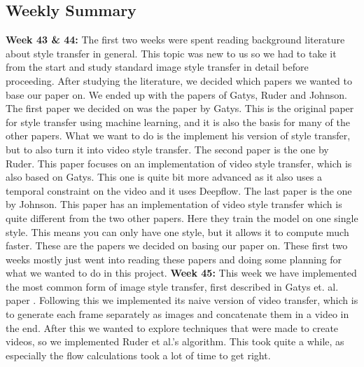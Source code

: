 \documentclass{article}
\begin{document}
\begin{center}
\section*{Weekly Summary}
\end{center}
\textbf{Week 43 \& 44:} \newline
The first two weeks were spent reading background literature about style transfer in general. This topic was new to us so we had to take it from the start and study standard image style transfer in detail before proceeding.\newline\newline
After studying the literature, we decided which papers we wanted to base our paper on. We ended up with the papers of Gatys, Ruder and Johnson. The first paper we decided on was the paper by Gatys. This is the original paper for style transfer using machine learning, and it is also the basis for many of the other papers. What we want to do is the implement his version of style transfer, but to also turn it into video style transfer.\newline\newline
The second paper is the one by Ruder. This paper focuses on an implementation of video style transfer, which is also based on Gatys. This one is quite bit more advanced as it also uses a temporal constraint on the video and it uses Deepflow.\newline\newline
The last paper is the one by Johnson. This paper has an implementation of video style transfer which is quite different from the two other papers. Here they train the model on one single style. This means you can only have one style, but it allows it to compute much faster.\newline\newline
These are the papers we decided on basing our paper on. These first two weeks mostly just went into reading these papers and doing some planning for what we wanted to do in this project.
\newline\newline
\textbf{Week 45:} \newline
This week we have implemented the most common form of image style transfer, first described in Gatys et. al. paper \cite{Gatys:1}. Following this we implemented its naive version of video transfer, which is to generate each frame separately as images and concatenate them in a video in the end. After this we wanted to explore techniques that were made to create videos, so we implemented Ruder et al.'s algorithm. This took quite a while, as especially the flow calculations took a lot of time to get right.\newline\newline
\end{document}
